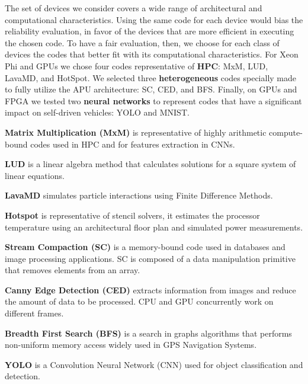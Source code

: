 The set of devices we consider covers a wide range of architectural and computational characteristics. Using the same code for each device would bias the reliability evaluation, in favor of the devices that are more efficient in executing the chosen code. 
To have a fair evaluation, then, we choose for each class of devices the codes that better fit with its computational characteristics. For Xeon Phi and GPUs we chose four codes representative of \textbf{HPC}: MxM, LUD, LavaMD, and HotSpot. We selected three \textbf{heterogeneous} codes specially made to fully utilize the APU architecture: SC, CED, and BFS. Finally, on GPUs and FPGA we tested two \textbf{neural networks} to represent codes that  have a significant impact on self-driven vehicles: YOLO and MNIST. 

\textbf{Matrix Multiplication (MxM)} is representative of highly arithmetic compute-bound codes used in HPC and for features extraction in CNNs. 

\textbf{LUD} is a linear algebra method that calculates solutions for a square system of linear equations.%

\textbf{LavaMD} simulates particle interactions using Finite Difference Methods. %

\textbf{Hotspot} is representative of stencil solvers, it estimates the processor temperature using an architectural
floor plan and simulated power measurements. 

\textbf{Stream Compaction (SC)} is a memory-bound code used in databases and image processing applications. SC is composed of a data manipulation primitive that removes elements from an array.

\textbf{Canny Edge Detection (CED)} extracts information from images and reduce the amount of data to be processed. CPU and GPU concurrently work on different frames. %

\textbf{Breadth First Search (BFS)} is a search in graphs algorithms that performs non-uniform memory access widely used in GPS Navigation Systems. 

\textbf{YOLO} is a Convolution Neural Network (CNN) used for object classification and detection. 

